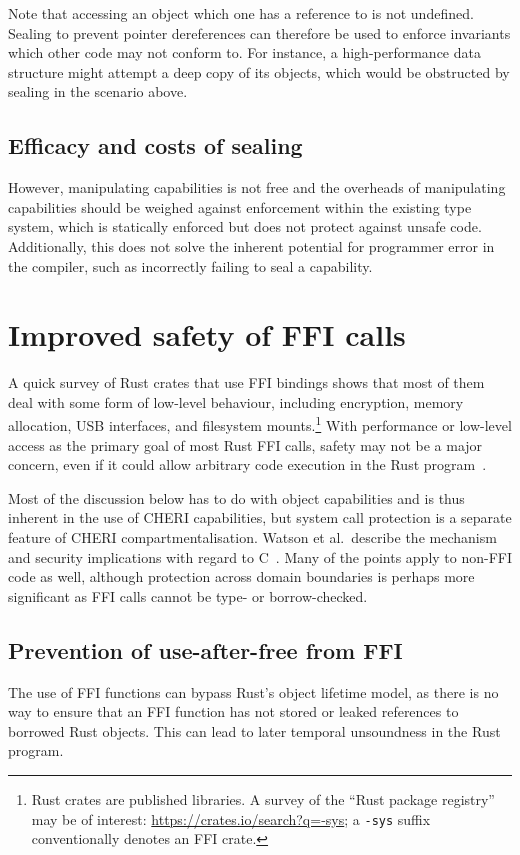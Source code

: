 \documentclass[dissertation.tex]{subfiles}
\begin{document}
Note that accessing an object which one has a reference to is not
undefined.
Sealing to prevent pointer dereferences can therefore be used to enforce
invariants which other code may not conform to.
For instance, a high-performance data structure might attempt a deep
copy of its objects, which would be obstructed by sealing in the
scenario above.


\subsection{Efficacy and costs of sealing}
However, manipulating capabilities is not free and the overheads of
manipulating capabilities should be weighed against enforcement within
the existing type system, which is statically enforced but does not
protect against unsafe code.
Additionally, this does not solve the inherent potential for programmer
error in the compiler, such as incorrectly failing to seal a capability.


\section{Improved safety of FFI calls}
\label{sec:eval-rust-xprocess}

A quick survey of Rust crates that use FFI bindings shows that most of
them deal with some form of low-level behaviour, including encryption,
memory allocation, USB interfaces, and filesystem mounts.\footnote{
    Rust crates are published libraries.
    A survey of the ``Rust package registry'' may be of interest:
    \url{https://crates.io/search?q=-sys};
    a \texttt{-sys} suffix conventionally denotes an FFI crate.
}
With performance or low-level access as the primary goal of most Rust
FFI calls, safety may not be a major concern, even if it could allow
arbitrary code execution in the Rust
program~\cite{szekeres-eternal-war}.

Most of the discussion below has to do with object capabilities and is
thus inherent in the use of CHERI capabilities, but system call
protection is a separate feature of CHERI compartmentalisation.
Watson et al.\ describe the mechanism and security implications with
regard to C~\cite{cheri2015}.
Many of the points apply to non-FFI code as well, although protection
across domain boundaries is perhaps more significant as FFI calls cannot
be type- or borrow-checked.

\subsection{Prevention of use-after-free from FFI}
The use of FFI functions can bypass Rust's object lifetime model, as
there is no way to ensure that an FFI function has not stored or leaked
references to borrowed Rust objects.
This can lead to later temporal unsoundness in the Rust program.
\end{document}
